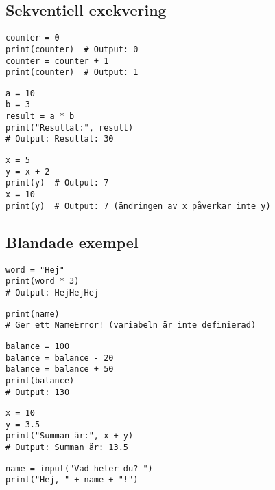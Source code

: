 \subsection*{Sekventiell exekvering}

\begin{lstlisting}[title=Exempel 8: Variabler kan ändra värde]
counter = 0
print(counter)  # Output: 0
counter = counter + 1
print(counter)  # Output: 1
\end{lstlisting}

\begin{lstlisting}[title=Exempel 9: Beräkningar med variabler]
a = 10
b = 3
result = a * b
print("Resultat:", result)
# Output: Resultat: 30
\end{lstlisting}

\begin{lstlisting}[title=Exempel 10: Variabler beroende av varandra]
x = 5
y = x + 2
print(y)  # Output: 7
x = 10
print(y)  # Output: 7 (ändringen av x påverkar inte y)
\end{lstlisting}

\subsection*{Blandade exempel}

\begin{lstlisting}[title=Exempel 11: Multiplicera text]
word = "Hej"
print(word * 3)
# Output: HejHejHej
\end{lstlisting}

\begin{lstlisting}[title=Exempel 12: Variabeln används innan den skapas]
print(name)
# Ger ett NameError! (variabeln är inte definierad)
\end{lstlisting}

\begin{lstlisting}[title=Exempel 13: Variabelns värde ändras stegvis]
balance = 100
balance = balance - 20
balance = balance + 50
print(balance)
# Output: 130
\end{lstlisting}

\begin{lstlisting}[title=Exempel 14: Variabler med flyttal och heltal tillsammans]
x = 10
y = 3.5
print("Summan är:", x + y)
# Output: Summan är: 13.5
\end{lstlisting}

\begin{lstlisting}[title=Exempel 15: Använda input och variabel tillsammans]
name = input("Vad heter du? ")
print("Hej, " + name + "!")
\end{lstlisting}

